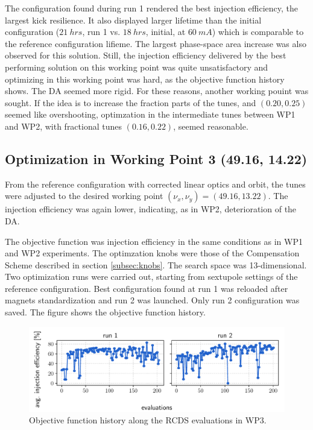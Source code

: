 The configuration found during run 1 rendered the best injection efficiency, the largest kick resilience. It also displayed larger lifetime than the initial configuration ($21~\unit{hrs}$, run 1 vs. $18~\unit{hrs}$, initial, at $60~\unit{mA}$) which is comparable to the reference configuration lifieme. The largest phase-space area increase was also observed for this solution. Still, the injection efficiency delivered by the best performing solution on this working point was quite unsatisfactory and optimizing in this working point was hard, as the objective function history shows. The DA seemed more rigid. For these reasons, another working pouint was sought. If the idea is to increase the fraction parts of the tunes, and $(0.20, 0.25)$ seemed like overshooting, optimzation in the intermediate tunes between WP1 and WP2, with fractional tunes $(0.16, 0.22)$, seemed reasonable.
\subsection{Optimization in Working Point 3 (49.16, 14.22)}
From the reference configuration with corrected linear optics and orbit, the tunes were adjusted to the desired working point $(\nu_x, \nu_y)=(49.16, 13.22)$. The injection efficiency was again lower, indicating, as in WP2, deterioration of the DA.

The objective function was injection efficiency in the same conditions as in WP1 and WP2 experiments. The optimzation knobs were those of the Compensation Scheme described in section \ref{subsec:knobs}. The search space was 13-dimensional. Two optimization runs were carried out, starting from sextupole settings of the reference configuration. Best configuration found at run 1 was reloaded after magnets standardization and run 2 was launched. Only run 2 configuration was saved. The figure shows the objective function history.
\begin{figure}[tb]
    \centering
    \includegraphics[width=\columnwidth]{Images/wp3_objfunc_hist.pdf}
    \caption[Objective function history along the RCDS evaluations in WP3.]{Objective function history along the RCDS evaluations in WP3.}
\end{figure}

